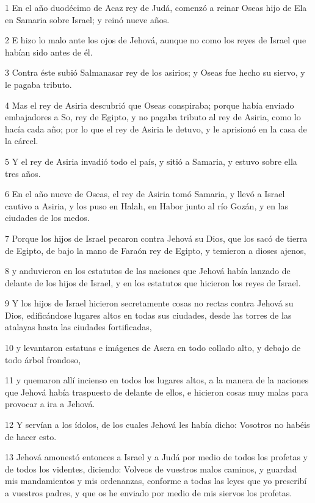 \par 1 En el año duodécimo de Acaz rey de Judá, comenzó a reinar Oseas hijo de Ela en Samaria sobre Israel; y reinó nueve años.
\par 2 E hizo lo malo ante los ojos de Jehová, aunque no como los reyes de Israel que habían sido antes de él.
\par 3 Contra éste subió Salmanasar rey de los asirios; y Oseas fue hecho su siervo, y le pagaba tributo.
\par 4 Mas el rey de Asiria descubrió que Oseas conspiraba; porque había enviado embajadores a So, rey de Egipto, y no pagaba tributo al rey de Asiria, como lo hacía cada año; por lo que el rey de Asiria le detuvo, y le aprisionó en la casa de la cárcel.
\par 5 Y el rey de Asiria invadió todo el país, y sitió a Samaria, y estuvo sobre ella tres años.
\par 6 En el año nueve de Oseas, el rey de Asiria tomó Samaria, y llevó a Israel cautivo a Asiria, y los puso en Halah, en Habor junto al río Gozán, y en las ciudades de los medos.
\par 7 Porque los hijos de Israel pecaron contra Jehová su Dios, que los sacó de tierra de Egipto, de bajo la mano de Faraón rey de Egipto, y temieron a dioses ajenos,
\par 8 y anduvieron en los estatutos de las naciones que Jehová había lanzado de delante de los hijos de Israel, y en los estatutos que hicieron los reyes de Israel.
\par 9 Y los hijos de Israel hicieron secretamente cosas no rectas contra Jehová su Dios, edificándose lugares altos en todas sus ciudades, desde las torres de las atalayas hasta las ciudades fortificadas,
\par 10 y levantaron estatuas e imágenes de Asera en todo collado alto, y debajo de todo árbol frondoso, 
\par 11 y quemaron allí incienso en todos los lugares altos, a la manera de la naciones que Jehová había traspuesto de delante de ellos, e hicieron cosas muy malas para provocar a ira a Jehová.
\par 12 Y servían a los ídolos, de los cuales Jehová les había dicho: Vosotros no habéis de hacer esto.
\par 13 Jehová amonestó entonces a Israel y a Judá por medio de todos los profetas y de todos los videntes, diciendo: Volveos de vuestros malos caminos, y guardad mis mandamientos y mis ordenanzas, conforme a todas las leyes que yo prescribí a vuestros padres, y que os he enviado por medio de mis siervos los profetas.
